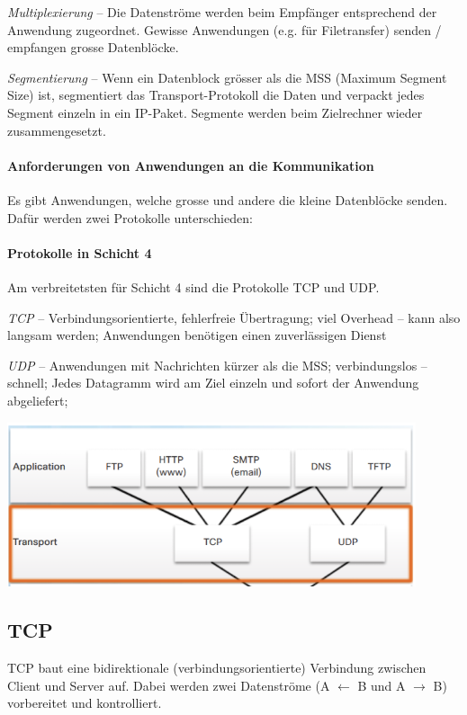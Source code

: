 \documentclass[a4paper,12pt]{article}
\begin{document}
\emph{Multiplexierung} -- Die Datenströme werden beim Empfänger entsprechend der Anwendung zugeordnet. Gewisse Anwendungen (e.g. für Filetransfer) senden / empfangen grosse Datenblöcke.

\emph{Segmentierung} -- Wenn ein Datenblock grösser als die MSS (Maximum Segment Size) ist, segmentiert das Transport-Protokoll die Daten und verpackt jedes Segment einzeln in ein IP-Paket. Segmente werden beim Zielrechner wieder zusammengesetzt.

\paragraph{Anforderungen von Anwendungen an die Kommunikation} Es gibt Anwendungen, welche grosse und andere die kleine Datenblöcke senden. Dafür werden zwei Protokolle unterschieden:


\paragraph{Protokolle in Schicht 4}
Am verbreitetsten für Schicht 4 sind die Protokolle TCP und UDP.


\emph{TCP} -- Verbindungsorientierte, fehlerfreie Übertragung; viel Overhead -- kann also langsam werden; Anwendungen benötigen einen zuverlässigen Dienst

\emph{UDP} -- Anwendungen mit Nachrichten kürzer als die MSS; verbindungslos -- schnell; Jedes Datagramm wird am Ziel einzeln und sofort der Anwendung abgeliefert;


\begin{center}
\includegraphics[width=12cm]{img/09_protocols.png}
\end{center}

\subsection{TCP}
TCP baut eine bidirektionale (verbindungsorientierte) Verbindung zwischen Client und Server auf. Dabei werden zwei Datenströme (A $\leftarrow$ B und A $\rightarrow$ B) vorbereitet und kontrolliert.
\end{document}
